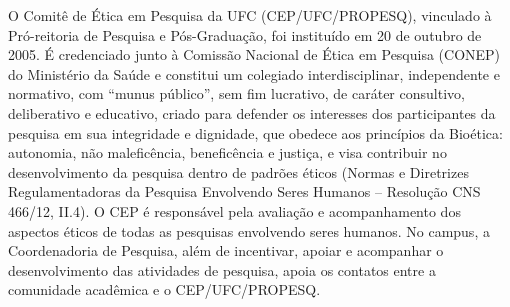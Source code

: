 O Comitê de Ética em Pesquisa da UFC (CEP/UFC/PROPESQ), vinculado à Pró-reitoria de Pesquisa e Pós-Graduação, foi instituído em 20 de outubro de 2005. É credenciado junto à Comissão Nacional de Ética em Pesquisa (CONEP) do Ministério da Saúde e constitui um colegiado interdisciplinar, independente e normativo, com ``munus público'', sem fim lucrativo, de caráter consultivo, deliberativo e educativo, criado para defender os interesses dos participantes da pesquisa em sua integridade e dignidade, que obedece aos princípios da Bioética: autonomia, não maleficência, beneficência e justiça, e visa contribuir no desenvolvimento da pesquisa dentro de padrões éticos (Normas e Diretrizes Regulamentadoras da Pesquisa Envolvendo Seres Humanos – Resolução CNS 466/12, II.4). O CEP é responsável pela avaliação e acompanhamento dos aspectos éticos de todas as pesquisas envolvendo seres humanos. No campus, a Coordenadoria de Pesquisa, além de incentivar, apoiar e acompanhar o desenvolvimento das atividades de pesquisa, apoia os contatos entre a comunidade acadêmica e o CEP/UFC/PROPESQ.